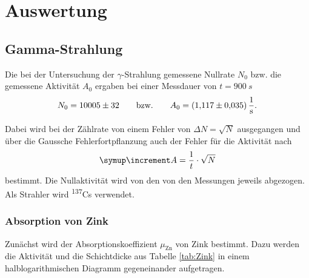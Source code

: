 \section{Auswertung}


\subsection{Gamma-Strahlung}
Die bei der Untersuchung der $\gamma$-Strahlung gemessene Nullrate $N_0$ bzw. die gemessene Aktivität $A_0$ ergaben bei einer Messdauer von $t = \SI{900}{s}$
\begin{equation}
    N_0 = 10005 \pm 32 \qquad \text{bzw.} \qquad A_0 = \SI{1.117 \pm 0.035}{\frac{1}{s}}. \notag
\end{equation}

Dabei wird bei der Zählrate von einem Fehler von $\Delta N = \sqrt{N}$ ausgegangen und über die Gaussche Fehlerfortpflanzung auch der Fehler für die Aktivität nach 
\begin{equation}
  \label{eq:fehler}
  \Del{A} = \frac{1}{t} \cdot \sqrt{N}
\end{equation} bestimmt.
Die Nullaktivität wird von den von den Messungen jeweils abgezogen.
Als Strahler wird \textsuperscript{137}Cs verwendet.

\subsubsection{Absorption von Zink}
Zunächst wird der Absorptionskoeffizient $\mu_\text{Zn}$ von Zink bestimmt.
Dazu werden die Aktivität und die Schichtdicke aus Tabelle \ref{tab:Zink} in einem halblogarithmischen Diagramm gegeneinander aufgetragen.

